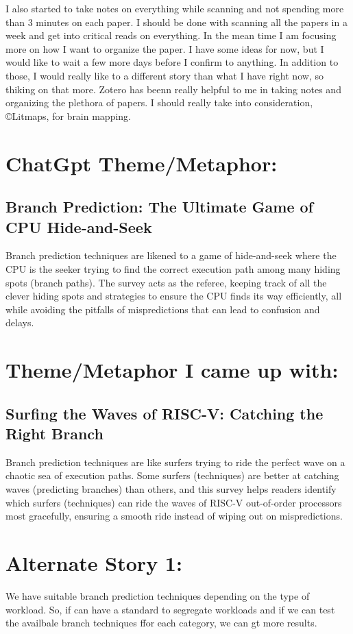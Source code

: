 \documentclass{article}
\begin{document}
I also started to take notes on everything while scanning and not spending more than 3 minutes on each paper. I should be done with scanning all the papers in a week and get into critical reads on everything. In the mean time I am focusing more on how I want to organize the paper. 
I have some ideas for now, but I would like to wait a few more days before I confirm to anything. In addition to those, I would really like to a different story than what I have right now, so thiking on that more. 
Zotero has beenn really helpful to me in taking notes and organizing the plethora of papers. I should really take into consideration, \copyright Litmaps, for brain mapping. 
\section*{ChatGpt Theme/Metaphor:}
\subsection*{ Branch Prediction: The Ultimate Game of CPU Hide-and-Seek}
Branch prediction techniques are likened to a game of hide-and-seek where the CPU is the seeker trying to find the correct execution path among many hiding spots (branch paths). The survey acts as the referee, keeping track of all the clever hiding spots and strategies to ensure the CPU finds its way efficiently, all while avoiding the pitfalls of mispredictions that can lead to confusion and delays.
\section*{Theme/Metaphor I came up with: }
\subsection*{Surfing the Waves of RISC-V: Catching the Right Branch}
Branch prediction techniques are like surfers trying to ride the perfect wave on a chaotic sea of execution paths. Some surfers (techniques) are better at catching waves (predicting branches) than others, and this survey helps readers identify which surfers (techniques) can ride the waves of RISC-V out-of-order processors most gracefully, ensuring a smooth ride instead of wiping out on mispredictions.

\section*{Alternate Story 1:}
We have suitable branch prediction techniques depending on the type of workload. So, if can have a standard to segregate workloads and if we can test the availbale branch techniques ffor each category, we can 
gt more results. 
\end{document}
